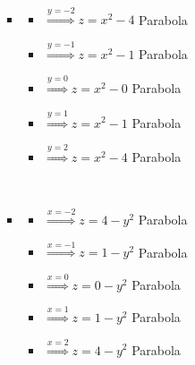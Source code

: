 \documentclass[../practica_02.tex]{subfiles}
\begin{document}
\begin{enumerate}
\begin{enumerate}
\begin{itemize}
                            $ $

                        \item
                            \begin{itemize}
                                \item $\stackrel{y=-2}{\Rightarrow} z = x^2 - 4 $ Parabola
                                \item $\stackrel{y=-1}{\Rightarrow} z = x^2 - 1 $ Parabola
                                \item $\stackrel{y=0}{\Rightarrow}  z = x^2 - 0 $ Parabola
                                \item $\stackrel{y=1}{\Rightarrow}  z = x^2 - 1 $ Parabola
                                \item $\stackrel{y=2}{\Rightarrow}  z = x^2 - 4 $ Parabola
                            \end{itemize}

                            $ $

                        \item
                            \begin{itemize}
                                \item $\stackrel{x=-2}{\Rightarrow} z = 4 - y^2 $ Parabola
                                \item $\stackrel{x=-1}{\Rightarrow} z = 1 - y^2 $ Parabola
                                \item $\stackrel{x=0}{\Rightarrow}  z = 0 - y^2 $ Parabola
                                \item $\stackrel{x=1}{\Rightarrow}  z = 1 - y^2 $ Parabola
                                \item $\stackrel{x=2}{\Rightarrow}  z = 4 - y^2 $ Parabola
                            \end{itemize}

                    \end{itemize}


\end{enumerate}
\end{enumerate}
\end{document}
